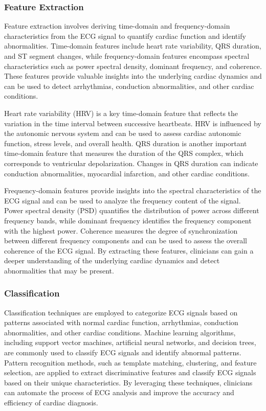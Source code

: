 \documentclass{zc-ust-hw}
\begin{document}
\subsubsection{Feature Extraction}

Feature extraction involves deriving time-domain and frequency-domain
characteristics from the ECG signal to quantify cardiac function and identify
abnormalities. Time-domain features include heart rate variability, QRS
duration, and ST segment changes, while frequency-domain features encompass
spectral characteristics such as power spectral density, dominant frequency,
and coherence. These features provide valuable insights into the underlying
cardiac dynamics and can be used to detect arrhythmias, conduction
abnormalities, and other cardiac conditions. \cite{gacek_2012_ecg}

Heart rate variability (HRV) is a key time-domain feature that reflects the
variation in the time interval between successive heartbeats. HRV is influenced
by the autonomic nervous system and can be used to assess cardiac autonomic
function, stress levels, and overall health. QRS duration is another important
time-domain feature that measures the duration of the QRS complex, which
corresponds to ventricular depolarization. Changes in QRS duration can indicate
conduction abnormalities, myocardial infarction, and other cardiac conditions.
\cite{gacek_2012_ecg}

Frequency-domain features provide insights into the spectral characteristics of
the ECG signal and can be used to analyze the frequency content of the signal.
Power spectral density (PSD) quantifies the distribution of power across
different frequency bands, while dominant frequency identifies the frequency
component with the highest power. Coherence measures the degree of
synchronization between different frequency components and can be used to
assess the overall coherence of the ECG signal. By extracting these features,
clinicians can gain a deeper understanding of the underlying cardiac dynamics
and detect abnormalities that may be present. \cite{gacek_2012_ecg}

\subsubsection{Classification}

Classification techniques are employed to categorize ECG signals based on
patterns associated with normal cardiac function, arrhythmias, conduction
abnormalities, and other cardiac conditions. Machine learning algorithms,
including support vector machines, artificial neural networks, and decision
trees, are commonly used to classify ECG signals and identify abnormal
patterns. Pattern recognition methods, such as template matching, clustering,
and feature selection, are applied to extract discriminative features and
classify ECG signals based on their unique characteristics. By leveraging these
techniques, clinicians can automate the process of ECG analysis and improve the
accuracy and efficiency of cardiac diagnosis. \cite{gacek_2012_ecg}
\end{document}
